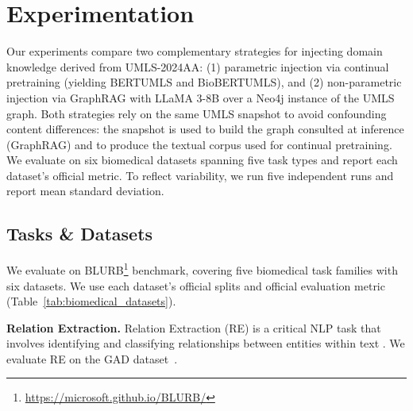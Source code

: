 \documentclass[10pt, a4paper]{article}
\begin{document}
\section{Experimentation}
Our experiments compare two complementary strategies for injecting domain knowledge derived from UMLS-2024AA:
(1) parametric injection via continual pretraining (yielding BERTUMLS and BioBERTUMLS), and
(2) non-parametric injection via GraphRAG with LLaMA 3-8B over a Neo4j instance of the UMLS graph.
Both strategies rely on the same UMLS snapshot to avoid confounding content differences: the snapshot is used to build the graph consulted at inference (GraphRAG) and to produce the textual corpus used for continual pretraining. We evaluate on six biomedical datasets spanning five task types and report each dataset’s official metric. To reflect variability, we run five independent runs and report mean standard deviation.
\subsection{Tasks \& Datasets}
We evaluate on BLURB\footnote{\url{https://microsoft.github.io/BLURB/}} benchmark, covering five biomedical task families with six datasets. We use each dataset’s official splits and official evaluation metric (Table~\ref{tab:biomedical_datasets}).


\begin{table}[htbp]
\caption{Summary of the biomedical datasets used with the number of classes and evaluation metrics.}
\label{tab:biomedical_datasets}
\end{table}
\textbf{ Relation Extraction.} Relation Extraction (RE) is a critical NLP task that involves identifying and classifying relationships between entities within text \cite{zhong2020frustratingly, lai2023biorex}. We evaluate RE on the GAD dataset~\cite{becker2004genetic}.
\end{document}
